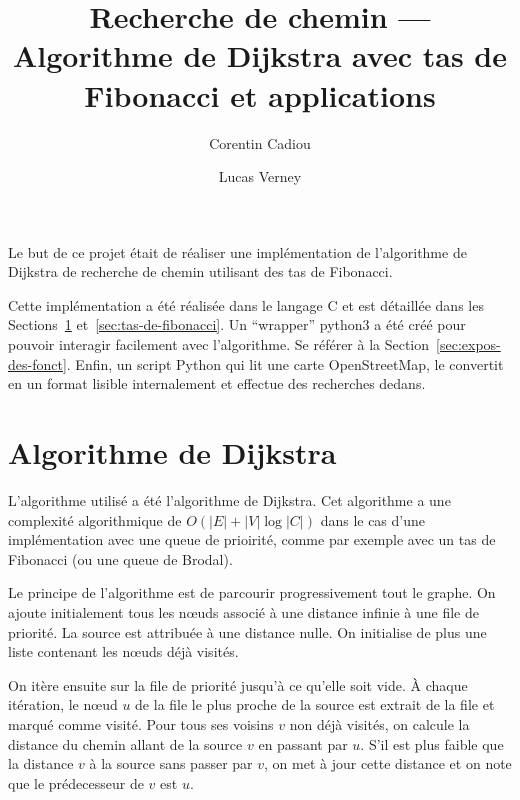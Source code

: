 \documentclass{article}
\title{Recherche de chemin --- Algorithme de Dijkstra avec tas de Fibonacci et applications}
\author{Corentin Cadiou \and Lucas Verney}
\begin{document}
\maketitle
Le but de ce projet était de réaliser une implémentation de
l'algorithme de Dijkstra de recherche de chemin utilisant des tas de
Fibonacci.

Cette implémentation a été réalisée dans le langage C et est détaillée
dans les Sections~\ref{sec:algor-de-dijkstra} et~\ref{sec:tas-de-fibonacci}. Un ``wrapper''
python3 a été créé pour pouvoir interagir facilement avec
l'algorithme. Se référer à la
Section~\ref{sec:expos-des-fonct}. Enfin, un script Python qui
lit une carte OpenStreetMap, le convertit en un format lisible
internalement et effectue des recherches dedans.

\section{Algorithme de Dijkstra}\label{sec:algor-de-dijkstra}
L'algorithme utilisé a été l'algorithme de Dijkstra. Cet algorithme a
une complexité algorithmique de $O(|E| + |V|\log|C|)$ dans le cas
d'une implémentation avec une queue de prioirité, comme par exemple
avec un tas de Fibonacci (ou une queue de Brodal).

Le principe de l'algorithme est de parcourir progressivement tout le
graphe. On ajoute initialement tous les nœuds associé à une distance
infinie à une file de priorité. La source est attribuée à une distance
nulle. On initialise de plus une liste contenant les nœuds déjà visités.

On itère ensuite sur la file de priorité jusqu'à ce qu'elle soit vide.
À chaque itération, le nœud $u$ de la file le plus proche de la source
est extrait de la file et marqué comme visité.
Pour tous ses voisins $v$ non déjà visités, on
calcule la distance du chemin allant de la source $v$ en passant par
$u$. S'il est plus faible que la distance $v$ à la source sans passer
par $v$, on met à jour cette distance et on note que le prédecesseur
de $v$ est $u$.
\end{document}
